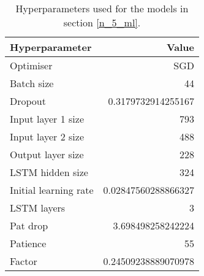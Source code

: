 \begin{table}
	\centering
	\begin{tabular}{l | r}
		Hyperparameter & Value \\
		\hline
		Optimiser & SGD \\
		Batch size & 44 \\
		Dropout & 0.3179732914255167 \\
		Input layer 1 size & 793 \\
		Input layer 2 size & 488 \\
		Output layer size & 228 \\
		LSTM hidden size & 324 \\
		Initial learning rate & 0.02847560288866327 \\
		LSTM layers & 3 \\
		Pat drop & 3.698498258242224 \\
		Patience & 55 \\
		Factor & 0.24509238889070978
	\end{tabular}
	\caption{Hyperparameters used for the models in section \ref{n_5_ml}.}
	\label{hyperparams_n_5}
\end{table}
